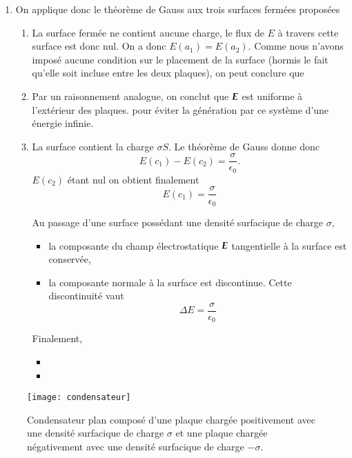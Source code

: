 \begin{corrige}
\begin{enumerate}
 	 \item On applique donc le théorème de Gauss aux trois surfaces fermées
	       proposées
	       \begin{enumerate}
		       \item La surface fermée ne contient aucune charge, le flux
			     de $E$ à travers cette surface est donc nul. On a donc
			     $E(a_1) = E(a_2)$. Comme nous n'avons imposé aucune condition
			     sur le placement de la surface (hormis le fait
			     qu'elle soit incluse entre les deux plaques), on peut
			     conclure que 
		       \item Par un raisonnement analogue, on conclut que $\vece$
			     est uniforme à l'extérieur des plaques.  pour éviter la génération
		     par ce système d'une énergie infinie.
	     		\item La surface contient la charge $\sigma S$. Le théorème de
			Gauss donne donc
			\begin{equation*}
			E(c_1) - E(c_2) = \dfrac{\sigma}{\epsilon_0}.
			\end{equation*}
			$E(c_2)$ étant nul on obtient finalement
			\begin{equation*}
				E(c_1) = \dfrac{\sigma}{\epsilon_0}
			\end{equation*}
			\begin{defn}
				Au passage d'une surface possédant une densité surfacique de
				charge $\sigma$, 
				\begin{itemize}
					\item la composante du champ électrostatique
					      $\vece$ tangentielle à la surface est
					      conservée,
					 \item la composante normale à la surface est 
					       discontinue. Cette discontinuité vaut
					       \begin{equation}
						       \Delta E = \dfrac{\sigma}{\epsilon_0}
					       \end{equation}
			      \end{itemize}
			\end{defn}
			Finalement,
			\begin{itemize}
				\item {}
				\item {}
		      \end{itemize}
	       \end{enumerate}
\end{enumerate}
\end{corrige}
\begin{figure}[h]
	\centering
	\texttt{[image: condensateur]}
	\caption{Condensateur plan composé d'une plaque chargée positivement avec 
	         une densité surfacique de charge $\sigma$ et une plaque chargée
	 	 négativement avec une densité surfacique de charge $-\sigma$.}%
	\label{fig:condensateur}
\end{figure}

